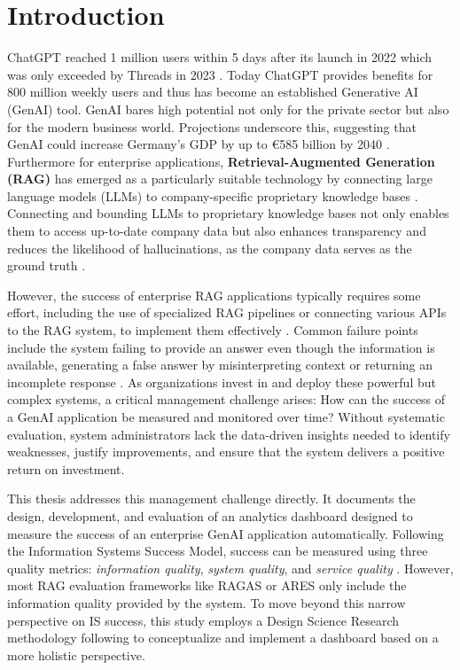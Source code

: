 \documentclass[
	english,
	ruledheaders=section,%
	class=report,%
	thesis={type=bachelor},%
	accentcolor=1b,%
	custommargins=true,%
	marginpar=false,%
	parskip=half-,%
	fontsize=11pt,%
	DIV=14,
]{tudapub}
\begin{document}
\chapter{Introduction}
ChatGPT reached 1 million users within 5 days after its launch in 2022 which was only exceeded by Threads in 2023 \parencite{Brandt2023}. Today ChatGPT provides benefits for 800 million weekly users \parencite{Huber2025} and thus has become an established Generative AI (GenAI) tool. GenAI bares high potential not only for the private sector but also for the modern business world. Projections underscore this, suggesting that GenAI could increase Germany's GDP by up to €585 billion by 2040 \parencite[p.~12]{McKinsey2023}. Furthermore for enterprise applications, \textbf{Retrieval-Augmented Generation (RAG)} has emerged as a particularly suitable technology by connecting large language models (LLMs) to company-specific proprietary knowledge bases  \parencite[p.~9459]{Lewis2020}. Connecting and bounding LLMs to proprietary knowledge bases not only enables them to access up-to-date company data \parencite{GoogleCloudRAG} but also enhances transparency and reduces the likelihood of hallucinations, as the company data serves as the ground truth  \parencite[p.~9469]{Lewis2020}.

However, the success of enterprise RAG applications typically requires some effort, including the use of specialized RAG pipelines or connecting various APIs to the RAG system, to implement them effectively \parencite[pp.~5--7]{Bruckhaus2024RAG}. Common failure points include the system failing to provide an answer even though the information is available, generating a false answer by misinterpreting context or returning an incomplete response \parencite[p.~91]{Barnett2024}. As organizations invest in and deploy these powerful but complex systems, a critical management challenge arises: How can the success of a GenAI application be measured and monitored over time? Without systematic evaluation, system administrators lack the data-driven insights needed to identify weaknesses, justify improvements, and ensure that the system delivers a positive return on investment.

This thesis addresses this management challenge directly. It documents the design, development, and evaluation of an analytics dashboard designed to measure the success of an enterprise GenAI application automatically. Following the Information Systems Success Model, success can be measured using three quality metrics: \textit{information quality}, \textit{system quality}, and \textit{service quality} \parencite[pp.~23--24]{DeloneMcLean2003ISSuccessTenYearUpdate}. However, most RAG evaluation frameworks like RAGAS \parencite{Es2024} or ARES \parencite{Saad-Falcon2024} only include the information quality provided by the system. To move beyond this narrow perspective on IS success, this study employs a Design Science Research methodology following \cite{Peffers2007} to conceptualize and implement a dashboard based on a more holistic perspective.
\end{document}
